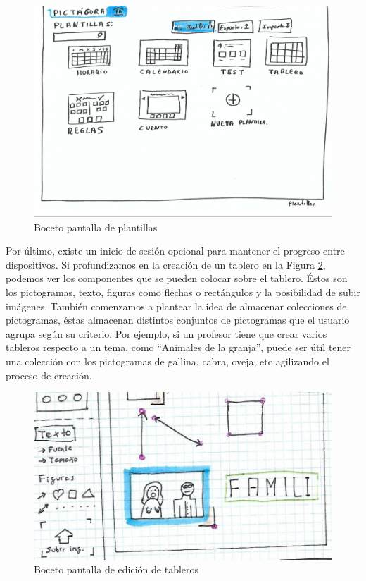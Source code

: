 \begin{figure}[h!]
	\centering
	\includegraphics[width=0.7\linewidth]{Imagenes/Bitmap/inicioAlfonso}
	\caption{Boceto pantalla de plantillas}
	\label{fig:inicioalfonso}
\end{figure}


Por último, existe un inicio de sesión opcional para mantener el progreso entre dispositivos. Si profundizamos en la creación de un tablero en la Figura \ref{fig:dibujolibrealfon}, podemos ver los componentes que se pueden colocar sobre el tablero. Éstos son los pictogramas, texto, figuras como flechas o rectángulos y la posibilidad de subir imágenes. También comenzamos a plantear la idea de almacenar colecciones de pictogramas, éstas almacenan distintos conjuntos de pictogramas que el usuario agrupa según su criterio. Por ejemplo, si un profesor tiene que crear varios tableros respecto a un tema, como “Animales de la granja”, puede ser útil tener una colección con los pictogramas de gallina, cabra, oveja, etc agilizando el proceso de creación.

\begin{figure}[h!]
	\centering
	\includegraphics[width=0.7\linewidth]{Imagenes/Bitmap/DibujoLibreAlfon}
	\caption{Boceto pantalla de edición de tableros }
	\label{fig:dibujolibrealfon}
\end{figure}


